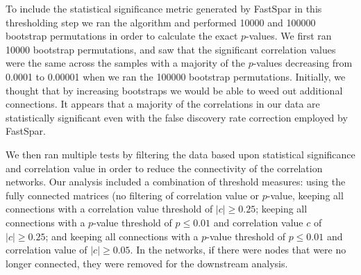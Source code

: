 To include the statistical significance metric generated by \acrshort{FastSpar} in this thresholding step we ran the algorithm and performed 10000 and 100000 bootstrap permutations in order to calculate the exact $p$-values. We first ran 10000 bootstrap permutations, and saw that the significant correlation values were the same across the samples with a majority of the $p$-values decreasing from 0.0001 to 0.00001 when we ran the 100000 bootstrap permutations. Initially, we thought that by increasing bootstraps we would be able to weed out additional connections. It appears that a majority of the correlations in our data are statistically significant even with the false discovery rate correction employed by \acrshort{FastSpar}.

 We then ran multiple tests by filtering the data based upon statistical significance and correlation value in order to reduce the connectivity of the correlation networks. Our analysis included a combination of threshold measures: using the fully connected matrices (no filtering of correlation value or $p$-value, keeping all connections with a correlation value threshold of $|c| \geq 0.25$; keeping all connections with a $p$-value threshold of $p \leq 0.01$ and correlation value $c$ of $|c| \geq 0.25$; and keeping all connections with a $p$-value threshold of $p \leq 0.01$ and correlation value of $|c| \geq 0.05$. In the networks, if there were nodes that were no longer connected, they were removed for the downstream analysis.

